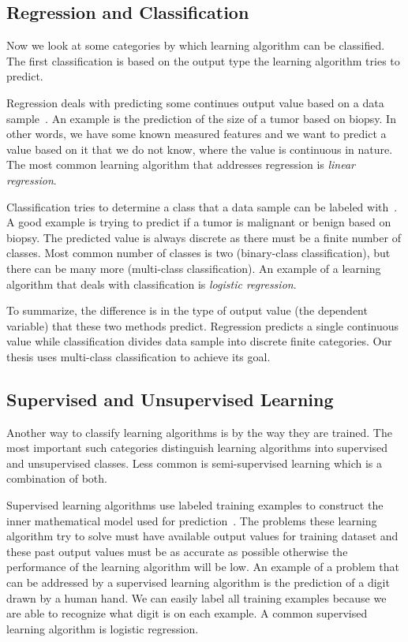 \subsection{Regression and Classification}

Now we look at some categories by which learning algorithm can be classified. The first classification is based on the output type the learning algorithm tries to predict.

Regression deals with predicting some continues output value based on a data sample~\cite{worster2007understanding}. An example is the prediction of the size of a tumor based on biopsy. In other words, we have some known measured features and we want to predict a value based on it that we do not know, where the value is continuous in nature. The most common learning algorithm that addresses regression is \textit{linear regression}.

Classification tries to determine a class that a data sample can be labeled with~\cite{worster2007understanding}. A good example is trying to predict if a tumor is malignant or benign based on biopsy. The predicted value is always discrete as there must be a finite number of classes. Most common number of classes is two (binary-class classification), but there can be many more (multi-class classification). An example of a learning algorithm that deals with classification is \textit{logistic regression}.

To summarize, the difference is in the type of output value (the dependent variable) that these two methods predict. Regression predicts a single continuous value while classification divides data sample into discrete finite categories. Our thesis uses multi-class classification to achieve its goal.

\subsection{Supervised and Unsupervised Learning}

Another way to classify learning algorithms is by the way they are trained. The most important such categories distinguish learning algorithms into supervised and unsupervised classes. Less common is semi-supervised learning which is a combination of both.

Supervised learning algorithms use labeled training examples to construct the inner mathematical model used for prediction~\cite{donalek2014supervised}. The problems these learning algorithm try to solve must have available output values for training dataset and these past output values must be as accurate as possible otherwise the performance of the learning algorithm will be low. An example of a problem that can be addressed by a supervised learning algorithm is the prediction of a digit drawn by a human hand. We can easily label all training examples because we are able to recognize what digit is on each example. A common supervised learning algorithm is logistic regression.

